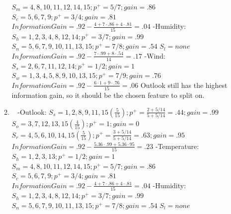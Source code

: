 \documentclass[12pt, fullpage,letterpaper]{article}
\begin{document}
\begin{enumerate}
\begin{enumerate}
	\newline $S_m=4, 8, 10, 11, 12, 14, 15; p^+=5/7;  gain=.86$
	\newline $S_c=5, 6, 7, 9; p^+=3/4;  gain=.81$
	\newline $Information Gain=.92-\frac{4+7\cdot.86+4\cdot.81}{15}=.04$
	\newline -Humidity:
	\newline $S_h = 1, 2, 3, 4, 8, 12, 14; p^+=3/7;  gain=.99$
	\newline $S_n=5, 6, 7, 9, 10, 11, 13, 15; p^+=7/8; gain=.54$
	\newline $S_l=none$
	\newline $Information Gain=.92-\frac{7\cdot.99+8\cdot.54}{14}=.17$
	\newline -Wind:
	\newline $S_s = 2, 6, 7, 11, 12, 14; p^+=1/2;  gain=1$
	\newline $S_w=1, 3, 4, 5, 8, 9, 10, 13, 15; p^+=7/9;  gain=.76$
	\newline $Information Gain=.92-\frac{6\cdot1+9\cdot.76}{15}=.06$
	\newline
	\newline Outlook still has the highest information gain, so it should be the chosen feature to split on.
\item~
\newline -Outlook:
	\newline $S_s = 1, 2,8, 9, 11, 15(\frac{5}{15}); p^+=\frac{2+5/14}{5+5/14}=.44; gain=.99$
	\newline $S_o=3, 7, 12, 13, 15(\frac{4}{15}); p^+ = 1; gain=0$
	\newline $S_r=4, 5, 6, 10, 14, 15(\frac{5}{15}); p^+=\frac{3+5/14}{5+5/14}=.63;  gain=.95$
	\newline $Information Gain=.92-\frac{5.36\cdot.99+5.36\cdot95}{15}=.23$
	\newline -Temperature:
	\newline $S_h = 1, 2, 3, 13; p^+=1/2; gain=1$
	\newline $S_m=4, 8, 10, 11, 12, 14, 15; p^+=5/7;  gain=.86$
	\newline $S_c=5, 6, 7, 9; p^+=3/4;  gain=.81$
	\newline $Information Gain=.92-\frac{4+7\cdot.86+4\cdot.81}{15}=.04$
	\newline -Humidity:
	\newline $S_h = 1, 2, 3, 4, 8, 12, 14; p^+=3/7;  gain=.99$
	\newline $S_n=5, 6, 7, 9, 10, 11, 13, 15; p^+=7/8;  gain=.54$
	\newline $S_l=none$

\end{enumerate}
\end{enumerate}
\end{document}
